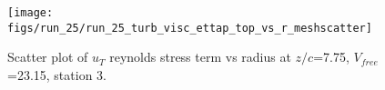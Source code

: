 \begin{figure}[H]
\centering
\texttt{[image: figs/run\_25/run\_25\_turb\_visc\_ettap\_top\_vs\_r\_meshscatter]}
\caption{Scatter plot of $
u_T$ reynolds stress term vs radius at $z/c$=7.75, $V_{free}$=23.15, station 3.}
\label{fig:run_25_turb_visc_ettap_top_vs_r_meshscatter}
\end{figure}


